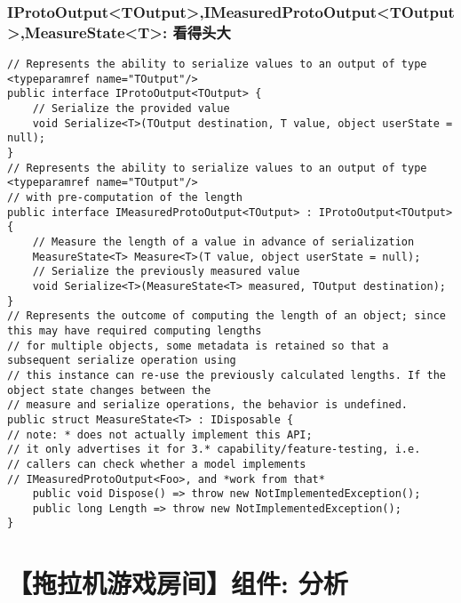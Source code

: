 \documentclass[9pt, b5paper]{article}
\begin{document}
\subsubsection{IProtoOutput<TOutput>,IMeasuredProtoOutput<TOutput>,MeasureState<T>: 看得头大}
\label{sec-2-18-3}
\begin{verbatim}
// Represents the ability to serialize values to an output of type <typeparamref name="TOutput"/>
public interface IProtoOutput<TOutput> {
    // Serialize the provided value
    void Serialize<T>(TOutput destination, T value, object userState = null);
}
// Represents the ability to serialize values to an output of type <typeparamref name="TOutput"/>
// with pre-computation of the length
public interface IMeasuredProtoOutput<TOutput> : IProtoOutput<TOutput> {
    // Measure the length of a value in advance of serialization
    MeasureState<T> Measure<T>(T value, object userState = null);
    // Serialize the previously measured value
    void Serialize<T>(MeasureState<T> measured, TOutput destination);
}
// Represents the outcome of computing the length of an object; since this may have required computing lengths
// for multiple objects, some metadata is retained so that a subsequent serialize operation using
// this instance can re-use the previously calculated lengths. If the object state changes between the
// measure and serialize operations, the behavior is undefined.
public struct MeasureState<T> : IDisposable {
// note: * does not actually implement this API;
// it only advertises it for 3.* capability/feature-testing, i.e.
// callers can check whether a model implements
// IMeasuredProtoOutput<Foo>, and *work from that*
    public void Dispose() => throw new NotImplementedException();
    public long Length => throw new NotImplementedException();
}
\end{verbatim}


\section{【拖拉机游戏房间】组件: 分析}
\label{sec-3}
\end{document}
